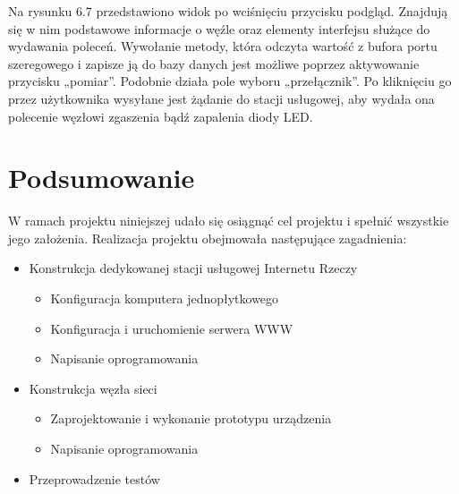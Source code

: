 \documentclass[12pt, twoside, openany]{mwrep}
\begin{document}
\par
Na rysunku 6.7 przedstawiono widok po wciśnięciu przycisku podgląd. Znajdują się w nim podstawowe informacje o węźle oraz elementy interfejsu służące do wydawania poleceń. Wywołanie metody, która odczyta wartość z bufora portu szeregowego i zapisze ją do bazy danych jest możliwe poprzez aktywowanie przycisku „pomiar”. Podobnie działa pole wyboru „przełącznik”. Po kliknięciu go przez użytkownika wysyłane jest żądanie do stacji usługowej, aby wydała ona polecenie węzłowi zgaszenia bądź zapalenia diody LED.

\chapter{Podsumowanie}
W ramach projektu niniejszej udało się osiągnąć cel projektu i spełnić wszystkie jego założenia. Realizacja projektu obejmowała następujące zagadnienia:
\begin{itemize}
\item	Konstrukcja dedykowanej stacji usługowej Internetu Rzeczy
\begin{itemize}
\item	Konfiguracja komputera jednopłytkowego
\item	Konfiguracja i uruchomienie serwera WWW
\item	Napisanie oprogramowania
\end{itemize}
\item	Konstrukcja węzła sieci
\begin{itemize}
\item	Zaprojektowanie i wykonanie prototypu urządzenia
\item	Napisanie oprogramowania
\end{itemize}
\item	Przeprowadzenie testów
\end{itemize}


\end{document}
